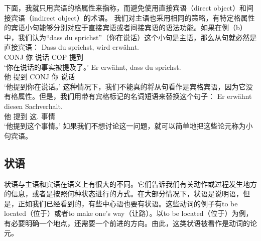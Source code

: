 下面，我就只用宾语的格属性来指称，而避免使用直接宾语（direct object）和间接宾语（indirect object）的术语。
我们对主语也采用相同的策略，有特定格属性的宾语小句能够分别对应于直接宾语或者间接宾语的语法功能。如果在例（b）中，我们认为“dass du sprichst”（你在说话）这个小句是主语，那么从句就必然是直接宾语：
\eal
\ex\label{Beispiel-dass-du-sprichst} 
\gll Dass du sprichst, wird erwähnt.\\
     CONJ 你 说话 COP 提到\\
\glt `你在说话的事实被提及了。'
\ex
\gll Er erwähnt, dass du sprichst.\\
	 他 提到 CONJ 你 说话\\
\glt `他提到你在说话。'
\zl
这种情况下，我们不能真的将从句看作是宾格宾语，因为它没有格属性。但是，我们用带有宾格标记的名词短语来替换这个句子：
\ea
\gll Er erwähnt diesen Sachverhalt.\\
	 他 提到 这.\acc{} 事情\\
\glt `他提到这个事情。'
\z
如果我们不想讨论这一问题，就可以简单地把这些论元称为小句宾语。


\subsection{状语}
\label{sec-Adverbiale}
状语与主语和宾语在语义上有很大的不同。它们告诉我们有关动作或过程发生地方的信息，或者是按照何种状态进行的方式。在大部分情况下，状语是说明语，但是，正如我们已经看到的，有些中心语也要有状语。这些动词的例子有to be located（位于）或者to make one's way（让路）。以to be located（位于）为例，有必要明确一个地点，还需要一个前进的方向。由此，这类状语被看作是动词的论元。

